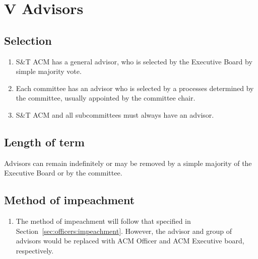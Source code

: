 \section{V \textendash{} Advisors}
\subsection{Selection}
\begin{enumerate}
  \item S\&T ACM has a general advisor, who is selected by the Executive Board
    by simple majority vote.
  \item Each committee has an advisor who is selected by a processes determined
    by the committee, usually appointed by the committee chair.
  \item S\&T ACM and all subcommittees must always have an advisor.
\end{enumerate}

\subsection{Length of term}
Advisors can remain indefinitely or may be removed by a simple majority of
the Executive Board or by the committee.

\subsection{Method of impeachment}
\begin{enumerate}
  \item The method of impeachment will follow that specified in
    Section~\ref{sec:officers:impeachment}.  However, the advisor and group of
    advisors would be replaced with ACM Officer and ACM Executive board,
    respectively.
\end{enumerate}
